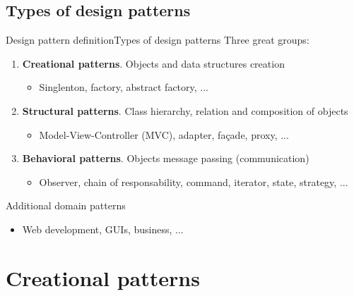 \documentclass[10pt,compress]{beamer} %
\begin{document}
\subsection[Types of design patterns]{Types of design patterns}

\begin{frame}{Design pattern definition}{Types of design patterns}
	Three great groups:
	\begin{enumerate}
		\item \textbf{Creational patterns}. Objects and data structures creation
			\begin{itemize}
			\item Singlenton, factory, abstract factory, ...
			\end{itemize}
		\item \textbf{Structural patterns}. Class hierarchy, relation and composition of objects
			\begin{itemize}
			\item Model-View-Controller (MVC), adapter, fa\c{c}ade, proxy, ...
			\end{itemize}
		\item \textbf{Behavioral patterns}. Objects message passing (communication)
			\begin{itemize}
			\item Observer, chain of responsability, command, iterator, state, strategy, ...
			\end{itemize}
	\end{enumerate}
	Additional domain patterns
	\begin{itemize}
		\item Web development, GUIs, business, ...
	\end{itemize}
\end{frame}

\section[Creational]{Creational patterns}
\end{document}
